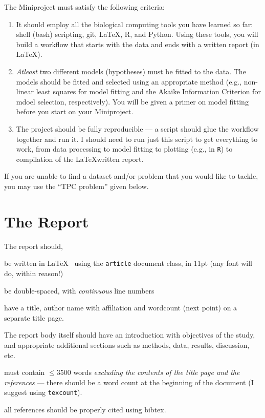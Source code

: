 The Miniproject must satisfy the following criteria:  
\begin{enumerate}
	
	\item It should employ all the biological computing tools you 
	have learned so far: shell (bash) scripting, git, \LaTeX, R, and 
	Python. Using these tools, you will build a workflow that starts with 
	the data and ends with a written report (in \LaTeX).
	
	\item {\it Atleast} two different models (hypotheses) must be fitted 
	to the data. The models should be fitted and selected using an 
	appropriate method (e.g., non-linear least squares for model fitting and 
	the Akaike Information Criterion for mdoel selection, respectively). 
	You will be given a primer on model fitting before you start on your 
	Miniproject. 
	
	\item The project should be fully reproducible --- a script should glue the 
	workflow together and run it. I should need to run just this script to get 
	everything to work, from data processing to model fitting to plotting 
	(e.g., in {\tt R}) to compilation of the \LaTeX written report.
	   
\end{enumerate}

If you are unable to find a dataset and/or problem that you would like 
to tackle, you may use the ``TPC problem'' given below.

\section{The Report}

	The report should,
	\begin{compactitem}
		\item be written in \LaTeX~ using the {\tt article} document class, 
		in 11pt (any font will do, within reason!)
	
		\item be double-spaced, with {\it continuous} line numbers 
	
		\item have a title, author name with affiliation and wordcount 
		(next point) on a separate title page.
		
		\item The report body itself should have an introduction with 
		objectives of the study, and appropriate additional 
		sections such as methods, data, results, discussion, etc. 
		
		\item must contain $\leq$3500 words {\it excluding the contents of 
		the title page and the references} --- there 
		should be a word count at the beginning of the document (I suggest using {\tt texcount}).
	
		\item all references should be properly cited using bibtex.
	
	\end{compactitem}

